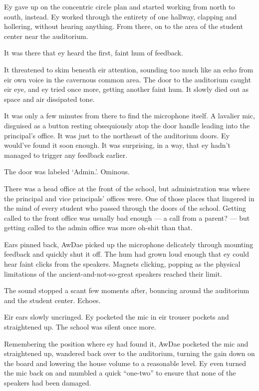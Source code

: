 Ey gave up on the concentric circle plan and started working from north to south, instead. Ey worked through the entirety of one hallway, clapping and hollering, without hearing anything. From there, on to the area of the student center near the auditorium.

It was there that ey heard the first, faint hum of feedback.

It threatened to skim beneath eir attention, sounding too much like an echo from eir own voice in the cavernous common area. The door to the auditorium caught eir eye, and ey tried once more, getting another faint hum. It slowly died out as space and air dissipated tone.

It was only a few minutes from there to find the microphone itself. A lavalier mic, disguised as a button resting obsequiously atop the door handle leading into the principal's office. It was just to the northeast of the auditorium doors. Ey would've found it soon enough. It was surprising, in a way, that ey hadn't managed to trigger any feedback earlier.

The door was labeled `Admin.'. Ominous.

There was a head office at the front of the school, but administration was where the principal and vice principals' offices were. One of those places that lingered in the mind of every student who passed through the doors of the school. Getting called to the front office was usually bad enough — a call from a parent? — but getting called to the admin office was more oh-shit than that.

Ears pinned back, AwDae picked up the microphone delicately through mounting feedback and quickly shut it off. The hum had grown loud enough that ey could hear faint clicks from the speakers. Magnets clicking, popping as the physical limitations of the ancient-and-not-so-great speakers reached their limit.

The sound stopped a scant few moments after, bouncing around the auditorium and the student center. Echoes.

Eir ears slowly uncringed. Ey pocketed the mic in eir trouser pockets and straightened up. The school was silent once more.

Remembering the position where ey had found it, AwDae pocketed the mic and straightened up, wandered back over to the auditorium, turning the gain down on the board and lowering the house volume to a reasonable level. Ey even turned the mic back on and mumbled a quick ``one-two'' to ensure that none of the speakers had been damaged.

